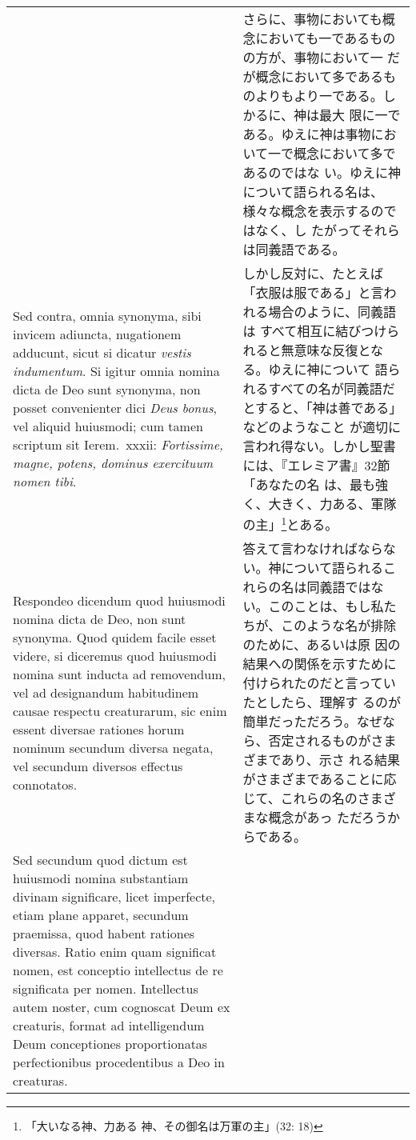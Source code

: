 \documentclass[10pt]{jsarticle} %
\begin{document}
\begin{longtable}{p{21em}p{21em}}
&

さらに、事物においても概念においても一であるものの方が、事物において一
だが概念において多であるものよりもより一である。しかるに、神は最大
限に一である。ゆえに神は事物において一で概念において多であるのではな
い。ゆえに神について語られる名は、様々な概念を表示するのではなく、し
たがってそれらは同義語である。

\\

{\sc Sed contra}, omnia synonyma, sibi invicem
 adiuncta, nugationem adducunt, sicut si dicatur {\it vestis indumentum}. Si
 igitur omnia nomina dicta de Deo sunt synonyma, non posset convenienter
 dici {\it Deus bonus}, vel aliquid huiusmodi; cum tamen scriptum sit
 Ierem.\ {\sc xxxii}: {\it Fortissime, magne, potens, dominus exercituum nomen tibi}.

&

しかし反対に、たとえば「衣服は服である」と言われる場合のように、同義語は
すべて相互に結びつけられると無意味な反復となる。ゆえに神について
語られるすべての名が同義語だとすると、「神は善である」などのようなこと
が適切に言われ得ない。しかし聖書には、『エレミア書』32節「あなたの名
は、最も強く、大きく、力ある、軍隊の主」\footnote{「大いなる神、力ある
神、その御名は万軍の主」(32: 18)}とある。

\\

{\sc Respondeo dicendum} quod huiusmodi nomina dicta de Deo, non sunt
synonyma. Quod quidem facile esset videre, si diceremus quod huiusmodi
nomina sunt inducta ad removendum, vel ad designandum habitudinem
causae respectu creaturarum, sic enim essent diversae rationes horum
nominum secundum diversa negata, vel secundum diversos effectus
connotatos.

&

答えて言わなければならない。神について語られるこれらの名は同義語ではな
い。このことは、もし私たちが、このような名が排除のために、あるいは原
因の結果への関係を示すために付けられたのだと言っていたとしたら、理解す
るのが簡単だっただろう。なぜなら、否定されるものがさまざまであり、示さ
れる結果がさまざまであることに応じて、これらの名のさまざまな概念があっ
ただろうからである。

\\

Sed secundum quod dictum est huiusmodi
 nomina substantiam divinam significare, licet imperfecte, etiam plane
 apparet, secundum praemissa, quod habent rationes diversas. Ratio enim
 quam significat nomen, est conceptio intellectus de re significata per
 nomen. Intellectus autem noster, cum cognoscat Deum ex creaturis,
 format ad intelligendum Deum conceptiones proportionatas perfectionibus
 procedentibus a Deo in creaturas. 


\end{longtable}
\end{document}
